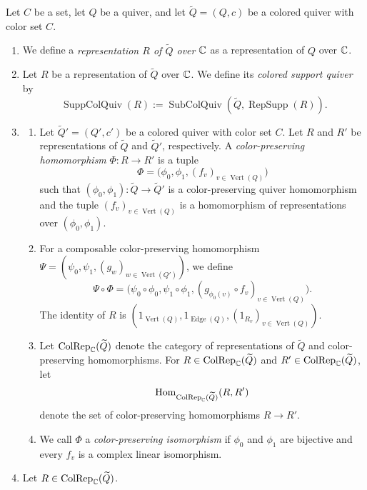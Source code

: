 \begin{definition}\label{def:colored-quiver-representations}
Let $C$ be a set, let $Q$ be a quiver, and let $\widetilde Q=(Q,c)$ be a colored quiver with color set $C$.
\begin{enumerate}[font=\itshape]
\item We define a \textit{representation $R$ of $\widetilde Q$ over $\mathbb C$} as a representation of $Q$ over $\mathbb C$.
\item Let $R$ be a representation of $\widetilde Q$ over $\mathbb C$. We define its \textit{colored support quiver} by
\[
 \operatorname{SuppColQuiv}(R):=\operatorname{SubColQuiv}(\widetilde Q,\operatorname{RepSupp}(R)).
\]
\item\begin{enumerate}[label=(\alph*),ref=\alph*,font=\itshape]
\item Let $\widetilde Q'=(Q',c')$ be a colored quiver with color set $C$.
Let $R$ and $R'$ be representations of $\widetilde Q$ and $\widetilde Q'$, respectively.
A \textit{color-preserving homomorphism} $\Phi:R\to R'$ is a tuple
\[
 \Phi=\bigl(\phi_0,\phi_1,(f_v)_{v\in\operatorname{Vert}(Q)}\bigr)
\]
such that $(\phi_0,\phi_1):\widetilde Q\to\widetilde Q'$ is a color-preserving quiver homomorphism
and the tuple $(f_v)_{v\in\operatorname{Vert}(Q)}$ is a homomorphism of representations over $(\phi_0,\phi_1)$.
\item For a composable color-preserving homomorphism
$\Psi=(\psi_0,\psi_1,(g_w)_{w\in\operatorname{Vert}(Q')})$, we define
\[
 \Psi\circ\Phi=
 \bigl(\psi_0\circ\phi_0,\psi_1\circ\phi_1,
 (g_{\phi_0(v)}\circ f_v)_{v\in\operatorname{Vert}(Q)}\bigr).
\]
The identity of $R$ is $(1_{\operatorname{Vert}(Q)},1_{\operatorname{Edge}(Q)},(1_{R_v})_{v\in\operatorname{Vert}(Q)})$.
\item Let $\operatorname{ColRep}_{\mathbb C}(\widetilde Q)$ denote the category of representations of $\widetilde Q$ and color-preserving homomorphisms.
For $R\in\operatorname{ColRep}_{\mathbb C}(\widetilde Q)$ and $R'\in\operatorname{ColRep}_{\mathbb C}(\widetilde Q)$, let
\[
 \operatorname{Hom}_{\operatorname{ColRep}_{\mathbb C}(\widetilde Q)}(R,R')
\]
denote the set of color-preserving homomorphisms $R\to R'$.
\item We call $\Phi$ a \textit{color-preserving isomorphism} if $\phi_0$ and $\phi_1$ are bijective
and every $f_v$ is a complex linear isomorphism.
\end{enumerate}
\item Let $R\in\operatorname{ColRep}_{\mathbb C}(\widetilde Q)$.

\end{enumerate}
\end{definition}
